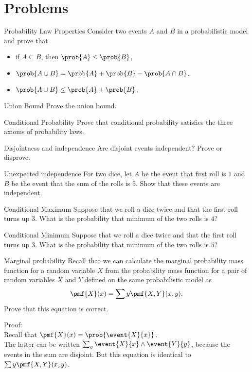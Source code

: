 \section{Problems}

\begin{probl}{Probability Law Properties}
Consider two events $A$ and $B$  in a probabilistic model and prove
that 
\begin{itemize}
\item if $A \subseteq B$, then  $\prob{A} \le \prob{B}$,
\item $\prob{A \cup B} = \prob{A}  + \prob{B} -  \prob{A \cap B}$.
\item $\prob{A \cup B} \le \prob{A}  + \prob{B}$.
\end{itemize}
\end{probl}


\begin{probl}{Union Bound}
Prove the union bound.
\end{probl}

\begin{probl}{Conditional Probability}
Prove that conditional probability satisfies the three axioms of
probability laws.
\end{probl}

\begin{probl}{Disjointness and independence}
Are disjoint events independent?  Prove or disprove.
\end{probl}


\begin{probl}{Unexpected independence}
For two dice, let $A$ be the event that first roll is $1$ and $B$ be
the event that the sum of the rolls is $5$.
Show that these events are independent.
\end{probl}

\begin{probl}{Conditional Maximum}
Suppose that we roll a dice twice and that the first roll turns up
$3$.  What is the probability that minimum of the two rolls is $4$?
\end{probl}

\begin{probl}{Conditional Minimum}
Suppose that we roll a dice twice and that the first roll turns up
$3$.  What is the probability that minimum of the two rolls is $5$?
\end{probl}

\begin{probl}{Marginal probability}
Recall that we can calculate the marginal probability mass function
for a random variable $X$ from the probability mass function for a
pair of random variables $X$ and $Y$ defined on the same probabilistic
model as
\[
\pmf{X}(x) = \sum{y}{\pmf{X,Y}(x,y)}.
\]
Prove that this equation is correct.
\end{probl}
\begin{answer}
Proof:  
\\
Recall that $\pmf{X}(x) = \prob{\event{X}{x}}$.
\\
The latter can be written $\sum_{y}{\event{X}{x} \land \event{Y}{y}}$,
because the events in the sum are disjoint. But this equation is
identical to  $\sum{y}{\pmf{X,Y}(x,y)}$.
\end{answer}


